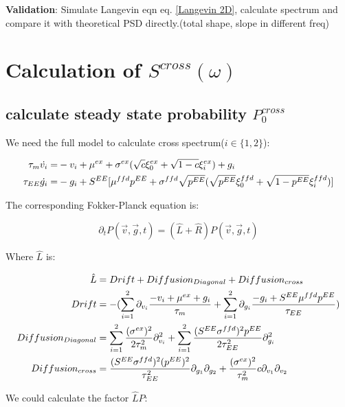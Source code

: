 \documentclass{article}
\begin{document}
	\textbf{Validation}: Simulate Langevin eqn eq. \eqref{Langevin 2D}, calculate spectrum and compare it with theoretical PSD directly.(total shape, slope in different freq)
	
	\section{Calculation of $S^{cross}(\omega)$}
	
	\subsection{calculate steady state probability $P_0^{cross}$}

	We need the full model to calculate cross spectrum($i\in\{1,2\}$):
	
	\begin{align}
		\tau_m \dot{v_i}=&-v_i+\mu^{ex}+\sigma^{ex}(\sqrt{c}\xi^{ex}_0+\sqrt{1-c}\xi_{i}^{ex})+{g_i}\notag\\
		\tau_{EE}\dot{g_{i}}=&-g_i+S^{EE}[\mu^{ffd}p^{EE}+\sigma^{ffd}\sqrt{p^{EE}}(\sqrt{p^{EE}}\xi^{ffd}_0+\sqrt{1-p^{EE}}\xi^{ffd}_i)]
		\label{Langevin 4D}
	\end{align}
	
	The corresponding Fokker-Planck equation is:
	
	\begin{equation}
		\partial_tP(\vec{v},\vec{g},t)=(\hat{L}+\hat{R})P(\vec{v},\vec{g},t)
		\label{4D FPE}
	\end{equation}
	
	Where $\hat{L}$ is: 
	
	\begin{align}
		\hat{L}&=Drift + Diffusion_{Diagonal}+Diffusion_{cross}\notag\\
		Drift&=-(\sum_{i=1}^{2}\partial_{v_i}\frac{-v_i+\mu^{ex}+g_i}{\tau_m}+\sum_{i=1}^{2}\partial_{g_i}\frac{-g_i+S^{EE}\mu^{ffd}p^{EE}}{\tau_{EE}})\notag\\
		Diffusion_{Diagonal}&=\sum_{i=1}^{2}\frac{(\sigma^{ex})^2}{2\tau_m^2}\partial_{v_i}^2+\sum_{i=1}^{2}\frac{(S^{EE}\sigma^{ffd})^2p^{EE}}{2\tau_{EE}^2}\partial_{g_i}^2\notag\\
		Diffusion_{cross}&=\frac{(S^{EE}\sigma^{ffd})^2(p^{EE})^2}{\tau_{EE}^2}\partial_{g_1}\partial_{g_2}+\frac{(\sigma^{ex})^2}{\tau_m^2}c\partial_{v_1}\partial_{v_2}
	\end{align}
	
	We could calculate the factor $\hat{L}P$:
	
\end{document}
